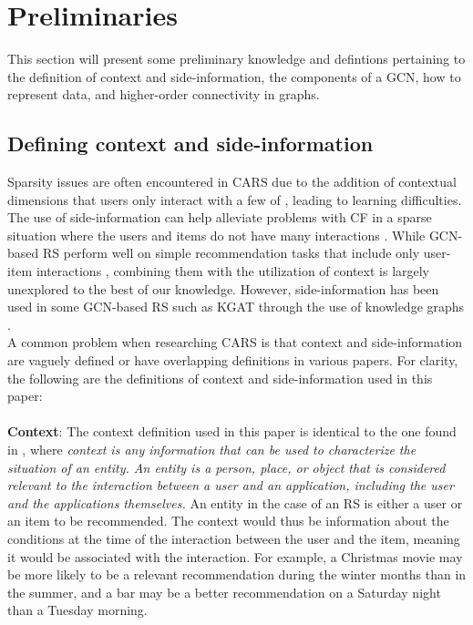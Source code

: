 \section{Preliminaries}\label{sec:preliminaries}
This section will present some preliminary knowledge and defintions pertaining to the definition of context and side-information, the components of a GCN, how to represent data, and higher-order connectivity in graphs.

\subsection{Defining context and side-information}\label{subsec:define_context_sideinfo}
Sparsity issues are often encountered in CARS due to the addition of contextual dimensions that users only interact with a few of \cite{SparsityCARS}, leading to learning difficulties.
The use of side-information can help alleviate problems with CF in a sparse situation where the users and items do not have many interactions \cite{KGAT}.
While GCN-based RS perform well on simple recommendation tasks that include only user-item interactions \cite{NGCF,LightGCN}, combining them with the utilization of context is largely unexplored to the best of our knowledge.
However, side-information has been used in some GCN-based RS such as KGAT through the use of knowledge graphs \cite{KGAT}.\\
A common problem when researching CARS is that context and side-information are vaguely defined or have overlapping definitions in various papers.
For clarity, the following are the definitions of context and side-information used in this paper:
\\\\
\textbf{Context}:
The context definition used in this paper is identical to the one found in \cite{contextDefinition}, where \textit{context is any information that can be used to characterize the situation of an entity. An entity is a person, place, or object that is considered relevant to the interaction between a user and an application, including the user and the applications themselves.}
An entity in the case of an RS is either a user or an item to be recommended.
The context would thus be information about the conditions at the time of the interaction between the user and the item, meaning it would be associated with the interaction.
For example, a Christmas movie may be more likely to be a relevant recommendation during the winter months than in the summer, and a bar may be a better recommendation on a Saturday night than a Tuesday morning.\\

